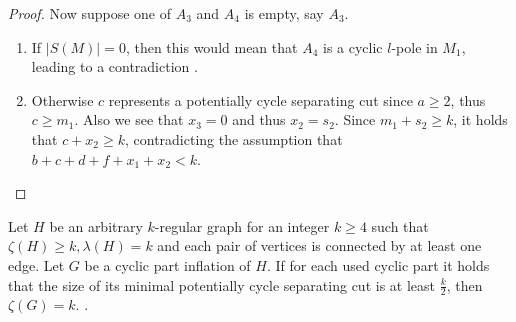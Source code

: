 \documentclass[12pt, twoside]{book}
\begin{document}
\begin{proof}
	Now suppose one of $A_3$ and $A_4$ is empty, say $A_3$.
	
	\begin{enumerate}
		\item If $|S(M)|=0$, then this would mean that $A_4$ is a cyclic $l$-pole in $M_1$, leading to a contradiction .
		\item Otherwise $c$ represents a potentially cycle separating cut since $a\geq 2$, thus $c\geq m_1$. Also we see that $x_3=0$ and thus $x_2=s_2$. Since $m_1+s_2\geq k$, it holds that $c+x_2\geq k$, contradicting the assumption that $b+c+d+f+x_1+x_2<k$.
	\end{enumerate}
\end{proof}

\begin{theorem}
	Let $H$ be an arbitrary $k$-regular graph for an integer $k\geq 4$ such that $\zeta(H)\geq k, \lambda(H)=k$ and each pair of vertices is connected by at least one edge. Let $G$ be a cyclic part inflation of $H$. If for each used cyclic part it holds that the size of its minimal potentially cycle separating cut is at least $\frac{k}{2}$, then $\zeta(G)=k$. .
\end{theorem}
\end{document}
